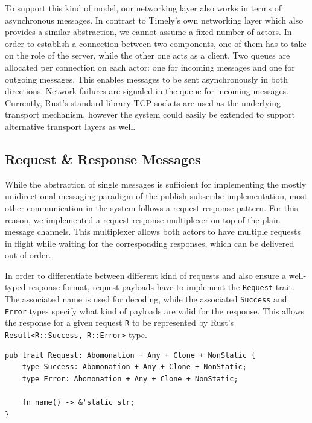 To support this kind of model, our networking layer also works in terms of
asynchronous messages. In contrast to Timely's own networking layer which also
provides a similar abstraction, we cannot assume a fixed number of actors.
In order to establish a connection between two components, one of them has to
take on the role of the server, while the other one acts as a client. Two
queues are allocated per connection on each actor: one for incoming messages
and one for outgoing messages. This enables messages to be sent asynchronously
in both directions. Network failures are signaled in the queue for incoming
messages. Currently, Rust's standard library TCP sockets are used as the
underlying transport mechanism, however the system could easily be extended to
support alternative transport layers as well.

\subsection{Request \& Response Messages} \label{sec:reqresp}

While the abstraction of single messages is sufficient for implementing the
mostly unidirectional messaging paradigm of the publish-subscribe implementation,
most other communication in the system follows a request-response pattern.
For this reason, we implemented a request-response multiplexer on
top of the plain message channels. This multiplexer allows both actors to have
multiple requests in flight while waiting for the corresponding responses,
which can be delivered out of order.

In order to differentiate between different kind of requests and also ensure a
well-typed response format, request payloads have to implement the \lstinline{Request}
trait. The associated name is used for decoding, while the associated \lstinline{Success}
and \lstinline{Error} types specify what kind of payloads are valid for the response.
This allows the response for a given request \lstinline{R} to be represented by
Rust's \lstinline{Result<R::Success, R::Error>} type.

\begin{lstlisting}[caption={[Request trait]In order for a type to be used as a
request message, it needs to implement the \lstinline{Request} trait. The name allows
request handlers to differentiate between different types of requests, while the associated
types forces them to issue well-formed responses.
The trait bounds are explained in section \ref{sec:serialization}.}]
pub trait Request: Abomonation + Any + Clone + NonStatic {
    type Success: Abomonation + Any + Clone + NonStatic;
    type Error: Abomonation + Any + Clone + NonStatic;

    fn name() -> &'static str;
}
\end{lstlisting}

